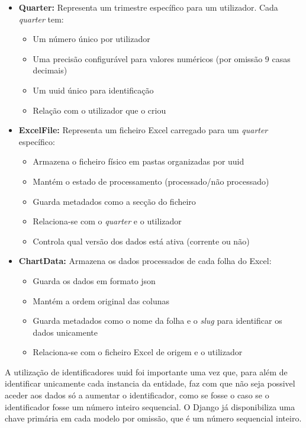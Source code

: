 \begin{itemize}
    \item \textbf{Quarter:} Representa um trimestre específico para um utilizador. Cada \textit{quarter} tem:
    \begin{itemize}
        \item Um número único por utilizador
        \item Uma precisão configurável para valores numéricos (por omissão 9 casas decimais)
        \item Um \gls{uuid} único para identificação
        \item Relação com o utilizador que o criou
    \end{itemize}

    \item \textbf{ExcelFile:} Representa um ficheiro Excel carregado para um \textit{quarter} específico:
    \begin{itemize}
        \item Armazena o ficheiro físico em pastas organizadas por \gls{uuid}
        \item Mantém o estado de processamento (processado/não processado)
        \item Guarda metadados como a secção do ficheiro
        \item Relaciona-se com o \textit{quarter} e o utilizador
        \item Controla qual versão dos dados está ativa (corrente ou não)
    \end{itemize}

    \item \textbf{ChartData:} Armazena os dados processados de cada folha do Excel:
    \begin{itemize}
        \item Guarda os dados em formato \gls{json}
        \item Mantém a ordem original das colunas
        \item Guarda metadados como o nome da folha e o \textit{slug} para identificar os dados unicamente
        \item Relaciona-se com o ficheiro Excel de origem e o utilizador
    \end{itemize}
\end{itemize}

A utilização de identificadores \gls{uuid} foi importante uma vez que, para além de identificar unicamente cada instancia da entidade, faz com que não seja possivel aceder aos dados só a aumentar o identificador, como se fosse o caso se o identificador fosse um número inteiro sequencial. O Django já disponibiliza uma chave primária em cada modelo por omissão, que é um número sequencial inteiro.

